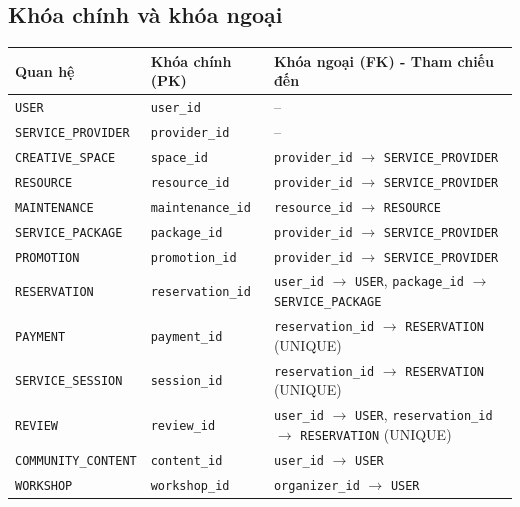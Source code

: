 \subsection{Khóa chính và khóa ngoại}
\begin{table}[htbp]
    \centering
    \renewcommand{\arraystretch}{1.2}
    \scriptsize
    \begin{tabular}{|l|l|l|}
        \hline
        \textbf{Quan hệ} & \textbf{Khóa chính (PK)} & \textbf{Khóa ngoại (FK) - Tham chiếu đến} \\ \hline
        \texttt{USER} & \texttt{user\_id} & -- \\ \hline
        \texttt{SERVICE\_PROVIDER} & \texttt{provider\_id} & -- \\ \hline
        \texttt{CREATIVE\_SPACE} & \texttt{space\_id} & \texttt{provider\_id} $\rightarrow$ \texttt{SERVICE\_PROVIDER} \\ \hline
        \texttt{RESOURCE} & \texttt{resource\_id} & \texttt{provider\_id} $\rightarrow$ \texttt{SERVICE\_PROVIDER} \\ \hline
        \texttt{MAINTENANCE} & \texttt{maintenance\_id} & \texttt{resource\_id} $\rightarrow$ \texttt{RESOURCE} \\ \hline
        \texttt{SERVICE\_PACKAGE} & \texttt{package\_id} & \texttt{provider\_id} $\rightarrow$ \texttt{SERVICE\_PROVIDER} \\ \hline
        \texttt{PROMOTION} & \texttt{promotion\_id} & \texttt{provider\_id} $\rightarrow$ \texttt{SERVICE\_PROVIDER} \\ \hline
        \texttt{RESERVATION} & \texttt{reservation\_id} & \texttt{user\_id} $\rightarrow$ \texttt{USER}, \texttt{package\_id} $\rightarrow$ \texttt{SERVICE\_PACKAGE} \\ \hline
        \texttt{PAYMENT} & \texttt{payment\_id} & \texttt{reservation\_id} $\rightarrow$ \texttt{RESERVATION} (UNIQUE) \\ \hline
        \texttt{SERVICE\_SESSION} & \texttt{session\_id} & \texttt{reservation\_id} $\rightarrow$ \texttt{RESERVATION} (UNIQUE) \\ \hline
        \texttt{REVIEW} & \texttt{review\_id} & \texttt{user\_id} $\rightarrow$ \texttt{USER}, \texttt{reservation\_id} $\rightarrow$ \texttt{RESERVATION} (UNIQUE) \\ \hline
        \texttt{COMMUNITY\_CONTENT} & \texttt{content\_id} & \texttt{user\_id} $\rightarrow$ \texttt{USER} \\ \hline
        \texttt{WORKSHOP} & \texttt{workshop\_id} & \texttt{organizer\_id} $\rightarrow$ \texttt{USER} \\ \hline

\end{tabular}
\end{table}
